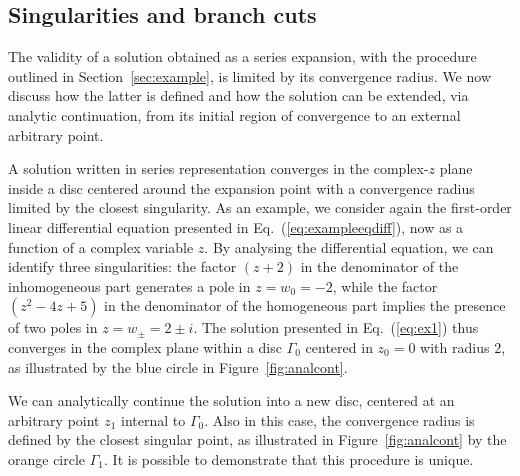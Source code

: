 \documentclass[final,1p,times]{elsarticle}
\begin{document}

\subsection{Singularities and branch cuts}
\label{sec:cuts}

The validity of a solution obtained as a series expansion, with the procedure outlined in Section~\ref{sec:example}, is limited by its convergence radius.
We now discuss how the latter is defined and how the solution can be extended, via analytic continuation, from its initial region of convergence to an external arbitrary point.

A solution written in series representation converges in the complex-$z$ plane inside a disc centered around the expansion point with a convergence radius limited by the closest singularity.
As an example, we consider again the first-order linear differential equation presented in Eq.~(\ref{eq:exampleeqdiff}), now as a function of a complex variable $z$.
By analysing the differential equation, we can identify three singularities: the factor $(z+2)$ in the denominator of the inhomogeneous part generates a pole in $z=w_0=-2$, while the factor $(z^2-4z+5)$ in the denominator of the homogeneous part implies the presence of two poles in $z=w_\pm=2\pm i$.
The solution presented in Eq.~(\ref{eq:ex1}) thus converges in the complex plane within a disc $\Gamma_0$ centered in $z_0=0$ with radius $2$, as illustrated by the blue circle in Figure~\ref{fig:analcont}.

We can analytically continue the solution into a new disc, centered at an arbitrary point $z_1$ internal to $\Gamma_0$. Also in this case, the convergence radius is defined by the closest singular point, as illustrated in Figure~\ref{fig:analcont} by the orange circle $\Gamma_1$.
It is possible to demonstrate that this procedure is unique.
\end{document}
